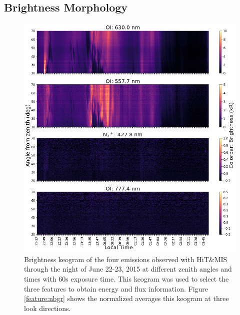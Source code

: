 \documentclass[crop=false,class=mitthesis,oneside,font=12pt]{standalone}
\begin{document}
\subsection{Brightness Morphology} 
\label{sec:bmorph}
\begin{figure}[H]
	\centering\includegraphics[width=35pc]{brg_night.png}
	\caption{Brightness keogram of the four emissions observed with HiT\&MIS through the night of June 22-23, 2015 at different zenith angles and times with 60s exposure time. This keogram was used to select the three features to obtain energy and flux information. Figure \ref{feature:nbgr} shows the normalized averages this keogram at three look directions.}
	\label{feature:brg}
\end{figure}
\end{document}
